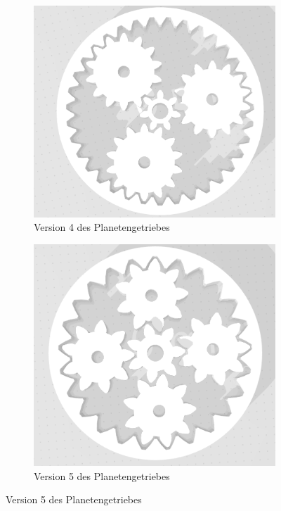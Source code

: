 \begin{figure}[!ht]
	\centering
	\begin{subfigure}[b]{0.4\textwidth}
		\includegraphics[width=\textwidth]{bilder/GetriebeVersion4-1.png}
		\caption{Version 4 des Planetengetriebes}
		\label{bild:gearversion4-1}
	\end{subfigure}
	\hspace{0.1\textwidth}%
	\begin{subfigure}[b]{0.4\textwidth}
		\includegraphics[width=\textwidth]{bilder/GetriebeVersion4-2.png}
		\caption{Version 5 des Planetengetriebes}
		\label{bild:gearversion4-2}
	\end{subfigure}



\end{figure}
